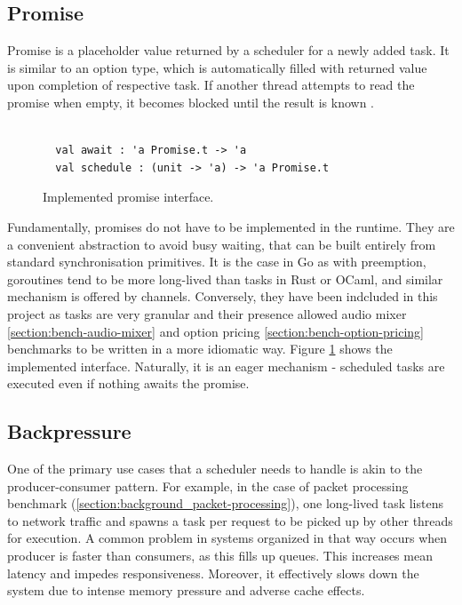 \documentclass[12pt,a4paper,twoside]{report}
\begin{document}

\subsection{Promise}
\label{section:promise}
Promise is a placeholder value returned by a scheduler for a newly added task. It is similar to an option type, which is automatically filled with returned value upon completion of respective task. If another thread attempts to read the promise when empty, it becomes blocked until the result is known \cite{Swalens2014}. 

\begin{figure}
    \centering
    \begin{verbatim}

  val await : 'a Promise.t -> 'a
  val schedule : (unit -> 'a) -> 'a Promise.t
    \end{verbatim}
    \caption{Implemented promise interface.}
    \label{fig:promise-interface}
\end{figure}


Fundamentally, promises do not have to be implemented in the runtime. They are a convenient abstraction to avoid busy waiting, that can be built entirely from standard synchronisation primitives. It is the case in Go \cite{chebyras74:online} as with preemption, goroutines tend to be more long-lived than tasks in Rust or OCaml, and similar mechanism is offered by channels. Conversely, they have been indcluded in this project as tasks are very granular and their presence allowed audio mixer \ref{section:bench-audio-mixer} and option pricing \ref{section:bench-option-pricing} benchmarks to be written in a more idiomatic way. Figure \ref{fig:promise-interface} shows the implemented interface. Naturally, it is an eager mechanism - scheduled tasks are executed even if nothing awaits the promise. 

\subsection{Backpressure}
One of the primary use cases that a scheduler needs to handle is akin to the producer-consumer pattern. For example, in the case of packet processing benchmark (\ref{section:background_packet-processing}), one long-lived task listens to network traffic and spawns a task per request to be picked up by other threads for execution. A common problem in systems organized in that way occurs when producer is faster than consumers, as this fills up queues. This increases mean latency and impedes responsiveness. Moreover, it effectively slows down the system due to intense memory pressure and adverse cache effects.
\end{document}

